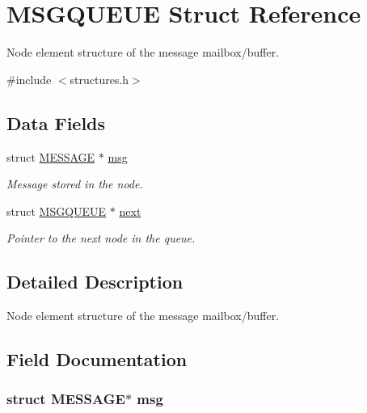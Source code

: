 \hypertarget{struct_m_s_g_q_u_e_u_e}{}\section{M\+S\+G\+Q\+U\+E\+UE Struct Reference}
\label{struct_m_s_g_q_u_e_u_e}


Node element structure of the message mailbox/buffer.  




{\ttfamily \#include $<$structures.\+h$>$}

\subsection*{Data Fields}
\begin{DoxyCompactItemize}
\item 
struct \hyperlink{struct_m_e_s_s_a_g_e}{M\+E\+S\+S\+A\+GE} $\ast$ \hyperlink{struct_m_s_g_q_u_e_u_e_addd993e0d1a2d8697937694b86b25c9f}{msg}
\begin{DoxyCompactList}\small\item\em Message stored in the node. \end{DoxyCompactList}\item 
struct \hyperlink{struct_m_s_g_q_u_e_u_e}{M\+S\+G\+Q\+U\+E\+UE} $\ast$ \hyperlink{struct_m_s_g_q_u_e_u_e_a3ce3a275ee413c607c79a8981174c43b}{next}
\begin{DoxyCompactList}\small\item\em Pointer to the next node in the queue. \end{DoxyCompactList}\end{DoxyCompactItemize}


\subsection{Detailed Description}
Node element structure of the message mailbox/buffer. 

\subsection{Field Documentation}
\subsubsection[{\texorpdfstring{msg}{msg}}]{\setlength{\rightskip}{0pt plus 5cm}struct {\bf M\+E\+S\+S\+A\+GE}$\ast$ msg}\hypertarget{struct_m_s_g_q_u_e_u_e_addd993e0d1a2d8697937694b86b25c9f}{}\label{struct_m_s_g_q_u_e_u_e_addd993e0d1a2d8697937694b86b25c9f}



